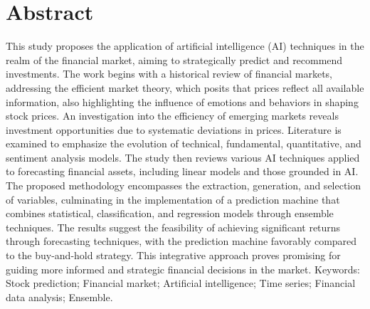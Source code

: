 \chapter*{Abstract}

\noindent 
This study proposes the application of artificial intelligence (AI) techniques in the realm of the financial market, aiming to strategically predict and recommend investments. The work begins with a historical review of financial markets, addressing the efficient market theory, which posits that prices reflect all available information, also highlighting the influence of emotions and behaviors in shaping stock prices. An investigation into the efficiency of emerging markets reveals investment opportunities due to systematic deviations in prices.
Literature is examined to emphasize the evolution of technical, fundamental, quantitative, and sentiment analysis models. The study then reviews various AI techniques applied to forecasting financial assets, including linear models and those grounded in AI. The proposed methodology encompasses the extraction, generation, and selection of variables, culminating in the implementation of a prediction machine that combines statistical, classification, and regression models through ensemble techniques.
The results suggest the feasibility of achieving significant returns through forecasting techniques, with the prediction machine favorably compared to the buy-and-hold strategy. This integrative approach proves promising for guiding more informed and strategic financial decisions in the market.
\vfill%
\noindent Keywords: Stock prediction; Financial market; Artificial intelligence; Time series; Financial data analysis; Ensemble.

